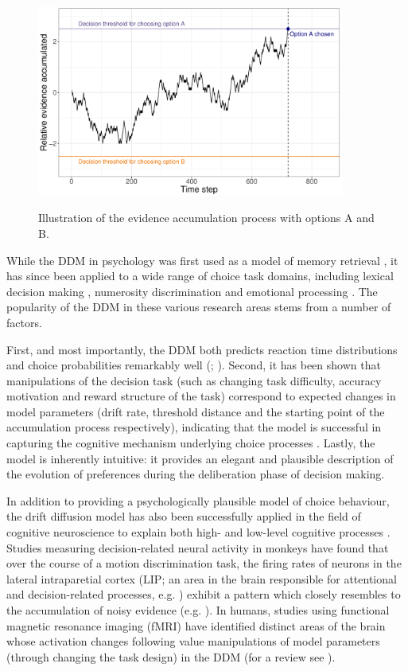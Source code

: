 \documentclass[11pt,a4paper]{article}
\begin{document}
\begin{figure}[h]
\centering
\caption{Illustration of the evidence accumulation process with options A and
B.}
\includegraphics[width=0.9\textwidth]{c1_randomwalk.pdf}
\label{fig:randomwalk}
\end{figure}


While the DDM in psychology was first used as a model of memory retrieval \cite{Ratcliff1978b}, it has since been applied to a wide range of choice task domains, including lexical decision making \cite{Ratcliff2004}, numerosity discrimination \cite{Leite2011} and emotional processing \cite{Mueller2016}. The popularity of the DDM in these various research areas stems from a number of factors. 

First, and most importantly, the DDM both predicts reaction time distributions and choice probabilities remarkably well (; ). Second, it has been shown that manipulations of the decision task (such as changing task difficulty, accuracy motivation and reward structure of the task) correspond to expected changes in model parameters (drift rate, threshold distance and the starting point of the accumulation process respectively), indicating that the model is successful in capturing the cognitive mechanism underlying choice processes \cite{Voss2004a}. Lastly, the model is inherently intuitive: it provides an elegant and plausible description of the evolution of preferences during the deliberation phase of decision making.

In addition to providing a psychologically plausible model of choice behaviour, the drift diffusion model has also been successfully applied in the field of cognitive neuroscience to explain both high- and low-level cognitive processes \cite{Forstmann2016}. Studies measuring decision-related neural activity in monkeys have found that over the course of a motion discrimination task, the firing rates of neurons in the lateral intraparetial cortex (LIP; an area in the brain responsible for attentional and decision-related processes, e.g. ) exhibit a pattern which closely resembles to the accumulation of noisy evidence (e.g. ). In humans, studies using functional magnetic resonance imaging (fMRI) have identified distinct areas of the brain whose activation changes following value manipulations of model parameters (through changing the task design) in the DDM (for a review see ). 
\end{document}
